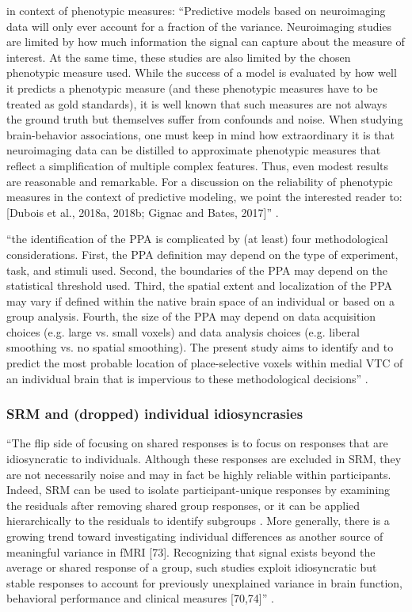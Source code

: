 \citet{scheinost2019ten} in context of phenotypic measures: ``Predictive models
based on neuroimaging data will only ever account for a fraction of the
variance. Neuroimaging studies are limited by how much information the signal
can capture about the measure of interest. At the same time, these studies are
also limited by the chosen phenotypic measure used.  While the success of a
model is evaluated by how well it predicts a phenotypic measure (and these
phenotypic measures have to be treated as gold standards), it is well known that
such measures are not always the ground truth but themselves suffer from
confounds and noise.  When studying brain-behavior associations, one must keep
in mind how extraordinary it is that neuroimaging data can be distilled to
approximate phenotypic measures that reflect a simplification of multiple
complex features. Thus, even modest results are reasonable and remarkable. For
a discussion on the reliability of phenotypic measures in the context of
predictive modeling, we point the interested reader to: [Dubois et al., 2018a,
2018b; Gignac and Bates, 2017]'' \citep{scheinost2019ten}.

``the identiﬁcation of the PPA is complicated by (at least) four
methodological considerations. First, the PPA deﬁnition may depend on the type
of experiment, task, and stimuli used. Second, the boundaries of the PPA may
depend on the statistical threshold used. Third, the spatial extent and
localization of the PPA may vary if deﬁned within the native brain space of an
individual or based on a group analysis. Fourth, the size of the PPA may depend
on data acquisition choices (e.g. large vs. small voxels) and data analysis
choices (e.g. liberal smoothing vs. no spatial smoothing). The present study
aims to identify and to predict the most probable location of place-selective
voxels within medial VTC of an individual brain that is impervious to these
methodological decisions'' \citep{weiner2018defining}.


\subsubsection{SRM and (dropped) individual idiosyncrasies}

``The flip side of focusing on shared responses is to focus on responses that
are idiosyncratic to individuals.
%
Although these responses are excluded in SRM, they are not necessarily noise and
may in fact be highly reliable within participants.
%
Indeed, SRM can be used to isolate participant-unique responses by examining the
residuals after removing shared group responses, or it can be applied
hierarchically to the residuals to identify subgroups \citep{chen2017shared}
\citep{cohen2017computational}.
%
More generally, there is a growing trend toward investigating individual
differences as another source of meaningful variance in fMRI [73].
%
Recognizing that signal exists beyond the average or shared response of a group,
such studies exploit idiosyncratic but stable responses to account for
previously unexplained variance in brain function, behavioral performance and
clinical measures [70,74]'' \citep{cohen2017computational}.


